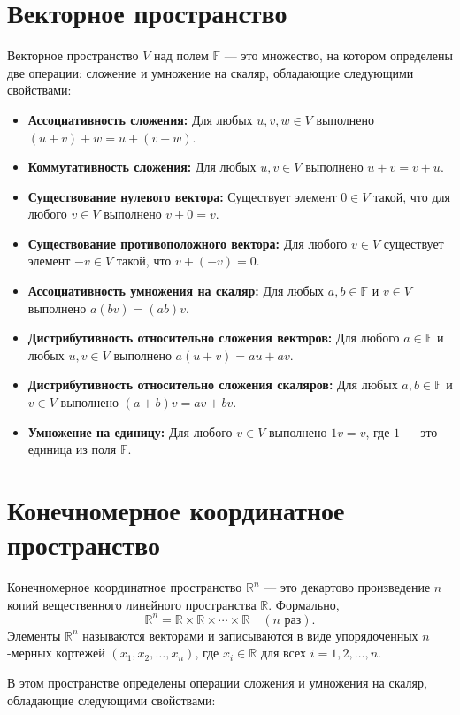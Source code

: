 \documentclass{article}
\begin{document}
\tableofcontents
\section{Векторное пространство}
Векторное пространство $V$ над полем $\mathbb{F}$ — это множество, на котором определены две операции: сложение и умножение на скаляр, обладающие следующими свойствами:

\begin{itemize}
    \item \textbf{Ассоциативность сложения:} Для любых $u, v, w \in V$ выполнено $(u + v) + w = u + (v + w)$.
    \item \textbf{Коммутативность сложения:} Для любых $u, v \in V$ выполнено $u + v = v + u$.
    \item \textbf{Существование нулевого вектора:} Существует элемент $0 \in V$ такой, что для любого $v \in V$ выполнено $v + 0 = v$.
    \item \textbf{Существование противоположного вектора:} Для любого $v \in V$ существует элемент $-v \in V$ такой, что $v + (-v) = 0$.
    \item \textbf{Ассоциативность умножения на скаляр:} Для любых $a, b \in \mathbb{F}$ и $v \in V$ выполнено $a(bv) = (ab)v$.
    \item \textbf{Дистрибутивность относительно сложения векторов:} Для любого $a \in \mathbb{F}$ и любых $u, v \in V$ выполнено $a(u + v) = au + av$.
    \item \textbf{Дистрибутивность относительно сложения скаляров:} Для любых $a, b \in \mathbb{F}$ и $v \in V$ выполнено $(a + b)v = av + bv$.
    \item \textbf{Умножение на единицу:} Для любого $v \in V$ выполнено $1v = v$, где $1$ — это единица из поля $\mathbb{F}$.
\end{itemize}
\section{Конечномерное координатное пространство}
Конечномерное координатное пространство $\mathbb{R}^n$ — это декартово произведение $n$ копий вещественного линейного пространства $\mathbb{R}$. Формально,
\[
\mathbb{R}^n = \mathbb{R} \times \mathbb{R} \times \cdots \times \mathbb{R} \quad (n \text{ раз}).
\]
Элементы $\mathbb{R}^n$ называются векторами и записываются в виде упорядоченных $n$-мерных кортежей $(x_1, x_2, \ldots, x_n)$, где $x_i \in \mathbb{R}$ для всех $i = 1, 2, \ldots, n$. 

В этом пространстве определены операции сложения и умножения на скаляр, обладающие следующими свойствами:
\end{document}

